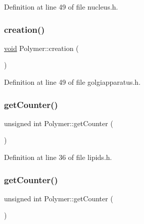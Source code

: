 Definition at line 49 of file nucleus.\+h.

\mbox{\label{class_polymer_a1daba3eb2ba8428bf2f3e814668b155f}} 
\subsubsection{\texorpdfstring{creation()}{creation()}\hspace{0.1cm}{\footnotesize\ttfamily [10/10]}}
{\footnotesize\ttfamily \mbox{\hyperlink{glad_8h_a950fc91edb4504f62f1c577bf4727c29}{void}} Polymer\+::creation (\begin{DoxyParamCaption}{ }\end{DoxyParamCaption})\hspace{0.3cm}{\ttfamily [inline]}}



Definition at line 49 of file golgiapparatus.\+h.

\mbox{\label{class_polymer_a8346d821e5f8690d7816ba1d40036b69}} 
\subsubsection{\texorpdfstring{get\+Counter()}{getCounter()}\hspace{0.1cm}{\footnotesize\ttfamily [1/10]}}
{\footnotesize\ttfamily unsigned int Polymer\+::get\+Counter (\begin{DoxyParamCaption}{ }\end{DoxyParamCaption})\hspace{0.3cm}{\ttfamily [inline]}}



Definition at line 36 of file lipids.\+h.

\mbox{\label{class_polymer_a8346d821e5f8690d7816ba1d40036b69}} 
\subsubsection{\texorpdfstring{get\+Counter()}{getCounter()}\hspace{0.1cm}{\footnotesize\ttfamily [2/10]}}
{\footnotesize\ttfamily unsigned int Polymer\+::get\+Counter (\begin{DoxyParamCaption}{ }\end{DoxyParamCaption})\hspace{0.3cm}{\ttfamily [inline]}}



